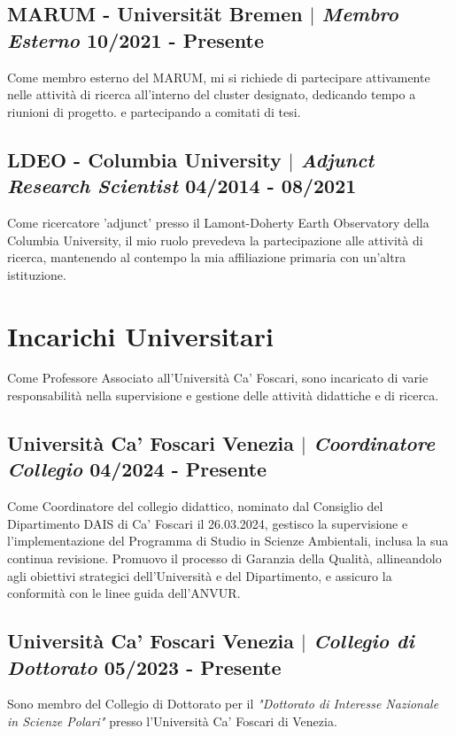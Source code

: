 \documentclass[11pt]{article}
\begin{document}
\subsection{MARUM - Universität Bremen $|$ {\normalfont\textit{Membro Esterno}} \hfill 10/2021 - Presente}
{\footnotesize Come membro esterno del MARUM, mi si richiede di partecipare attivamente nelle attività di ricerca all'interno del cluster designato, dedicando tempo a riunioni di progetto. e partecipando a comitati di tesi.}
\bigskip

\subsection{LDEO - Columbia University $|$ {\normalfont\textit{Adjunct Research Scientist}} \hfill 04/2014 - 08/2021}
{\footnotesize Come ricercatore 'adjunct' presso il Lamont-Doherty Earth Observatory della Columbia University, il mio ruolo prevedeva la partecipazione alle attività di ricerca, mantenendo al contempo la mia affiliazione primaria con un'altra istituzione.}

\section{Incarichi Universitari}
{\normalfont Come Professore Associato all'Università Ca' Foscari, sono incaricato di varie responsabilità nella supervisione e gestione delle attività didattiche e di ricerca.}\\
\bigskip
\subsection{Università Ca' Foscari Venezia $|$ {\normalfont\textit{Coordinatore Collegio}} \hfill 04/2024 - Presente}
{\footnotesize Come Coordinatore del collegio didattico, nominato dal Consiglio del Dipartimento DAIS di Ca' Foscari il 26.03.2024, gestisco la supervisione e l'implementazione del Programma di Studio in Scienze Ambientali, inclusa la sua continua revisione. Promuovo il processo di Garanzia della Qualità, allineandolo agli obiettivi strategici dell'Università e del Dipartimento, e assicuro la conformità con le linee guida dell'ANVUR.}
\bigskip

\subsection{Università Ca' Foscari Venezia $|$ {\normalfont\textit{Collegio di Dottorato}} \hfill 05/2023 - Presente}
{\footnotesize Sono membro del Collegio di Dottorato per il \textit{"Dottorato di Interesse Nazionale in Scienze Polari"} presso l'Università Ca' Foscari di Venezia.}
\bigskip
\end{document}
